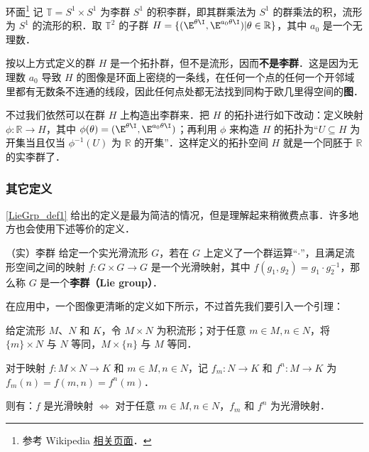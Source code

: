 \begin{definition}{环面\footnote{参考 Wikipedia \href{https://en.wikipedia.org/wiki/Lie_group}{相关页面}．}}\label{LieGrp_def2}
记 $\mathbb{T}=S^1\times S^1$ 为李群 $S^1$ 的积李群，即其群乘法为 $S^1$ 的群乘法的积，流形为 $S^1$ 的流形的积．取 $\mathbb{T}^2$ 的子群 $H=\{(\E^{\theta\I}, \E^{a_0\theta\I})|\theta\in\mathbb{R}\}$，其中 $a_0$ 是一个无理数．

按以上方式定义的群 $H$ 是一个拓扑群，但不是流形，因而\textbf{不是李群}．这是因为无理数 $a_0$ 导致 $H$ 的图像是环面上密绕的一条线，在任何一个点的任何一个开邻域里都有无数条不连通的线段，因此任何点处都无法找到同构于欧几里得空间的\textbf{图}．

不过我们依然可以在群 $H$ 上构造出李群来．把 $H$ 的拓扑进行如下改动：定义映射 $\phi:\mathbb{R}\to H$，其中 $\phi(\theta)=(\E^{\theta\I}, \E^{a_0\theta\I})$；再利用 $\phi$ 来构造 $H$ 的拓扑为“$U\subseteq H$ 为开集当且仅当 $\phi^{-1}(U)$ 为 $\mathbb{R}$ 的开集”．这样定义的拓扑空间 $H$ 就是一个同胚于 $\mathbb{R}$ 的实李群了．
\end{definition}


\subsubsection{其它定义}

\autoref{LieGrp_def1} 给出的定义是最为简洁的情况，但是理解起来稍微费点事．许多地方也会使用下述等价的定义．

\begin{definition}{（实）李群}\label{LieGrp_def1}
给定一个实光滑流形 $G$，若在 $G$ 上定义了一个群运算“$\cdot$”，且满足流形空间之间的映射 $f:G\times G\rightarrow G$ 是一个光滑映射，其中 $f(g_1, g_2)=g_1\cdot g_2^{-1}$，那么称 $G$ 是一个\textbf{李群（Lie group）}．
\end{definition}



在应用中，一个图像更清晰的定义如下所示，不过首先我们要引入一个引理：

\begin{lemma}{}\label{LieGrp_lem1}
给定流形 $M$、$N$ 和 $K$，令 $M\times N$ 为积流形；对于任意 $m\in M, n\in N$，将 $\{m\}\times N$ 与 $N$ 等同，$M\times \{n\}$ 与 $M$ 等同．

对于映射 $f:M\times N\to K$ 和 $m\in M, n\in N$，记 $f_m:N\to K$ 和 $f^n:M\to K$ 为 $f_m(n)=f(m, n)=f^n(m)$．

则有：$f$ 是光滑映射 $\iff$ 对于任意 $m\in M, n\in N$，$f_m$ 和 $f^n$ 为光滑映射．
\end{lemma}

